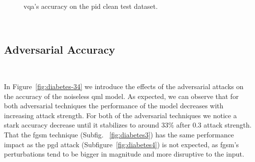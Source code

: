 \begin{figure}[!h]
  \caption{\ac{vqa}'s accuracy on the \ac{pid} clean test dataset.}
  \label{fig:diabetes-12}
\end{figure} \

\subsection{Adversarial Accuracy}\label{subsection:diabetes-adv-acc} \

In Figure~\ref{fig:diabetes-34} we introduce the effects of the
adversarial attacks on the accuracy of the noiseless \ac{qml}
model. As expected, we can observe that for both adversarial
techniques the performance of the model decreases with increasing
attack strength. For both of the adversarial techniques
we notice a stark accuracy decrease until it stabilizes to around
\(33\%\) after \(0.3\) attack strength. That the \ac{fgsm} technique (Subfig.
~\ref{fig:diabetes3}) has the same performance impact as the \ac{pgd}
attack (Subfigure~\ref{fig:diabetes4}) is not expected, as \ac{fgsm}'s
perturbations tend to be bigger in magnitude and more disruptive
to the input. \

